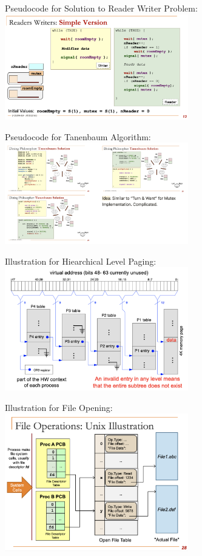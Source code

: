 \documentclass[10pt,landscape,letterpaper]{article}
\begin{document}
\begin{multicols}{3}
Pseudocode for Solution to Reader Writer Problem:
\\
\includegraphics[width=8cm]{img/08_reader_writer.png}

Pseudocode for Tanenbaum Algorithm:
\\
\includegraphics[width=8cm]{img/08_tanenbaum.png}

Illustration for Hiearchical Level Paging:
\\
\includegraphics[width=8cm]{img/11_hierarchical_paging.png}

Illustration for File Opening:
\\
\includegraphics[width=8cm]{img/12_open_file_table.png}


\end{multicols}
\end{document}
